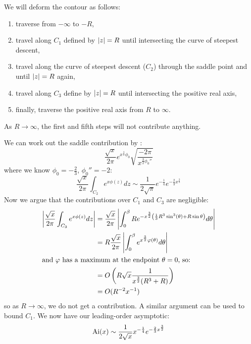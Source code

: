 \documentclass[../Main.tex]{subfiles}
\begin{document}
We will deform the contour as follows:
\begin{enumerate}
    \item traverse from $-\infty$ to $-R$,
    \item travel along $C_1$ defined by $\left|z\right| = R$ until intersecting the curve of steepest descent,
    \item travel along the curve of steepest descent ($C_2$) through the saddle point and until $\left|z\right| = R$ again,
    \item travel along $C_3$ define by $\left|z\right| = R$ until intersecting the positive real axis,
    \item finally, traverse the positive real axis from $R$ to $\infty$.
\end{enumerate}
As $R \to \infty$, the first and fifth steps will not contribute anything.

We can work out the saddle contribution by :
\begin{equation*}
    \frac{\sqrt{x}}{2\pi} e^{x^{\frac32} \phi_0} \sqrt{\frac{-2\pi}{x^{\frac32 \phi_0''}}}
\end{equation*}
where we know $\phi_0 = -\frac23$, $\phi_0'' = -2$:
\begin{equation*}
    \frac{\sqrt{x}}{2\pi} \int_{C_2} e^{x\phi(z)} dz \sim \frac{1}{2\sqrt{\pi}} e^{-\frac14} e^{-\frac23 x^{\frac32}}
\end{equation*}
Now we argue that the contributions over $C_1$ and $C_3$ are negligible:
\begin{align*}
    \left|\frac{\sqrt{x}}{2\pi}\int_{C_3}e^{x\phi(z)} dz\right| &= \frac{\sqrt{x}}{2\pi} \left|\int_{0}^{\beta} R e^{-x^{\frac32} \left(\frac13 R^3 \sin^3(\theta) + R\sin\theta\right)} d\theta\right| \\
    &= R\frac{\sqrt{x}}{2\pi} \left|\int_{0}^{\beta} e^{x^{\frac32} \varphi(\theta)} d\theta\right| \\
    \intertext{and $\varphi$ has a maximum at the endpoint $\theta = 0$, so:}
    &= O\left(R \sqrt{x} \frac{1}{x^{\frac32} (R^3 + R)}\right) \\
    &= O(R^{-2} x^{-1})
\end{align*}
so as $R \to \infty$, we do not get a contribution. A similar argument can be used to bound $C_1$. We now have our leading-order asymptotic:
\begin{equation*}
    \operatorname{Ai}(x) \sim \frac{1}{2\sqrt{x}} x^{-\frac14} e^{-\frac23 x^{\frac32}}
\end{equation*}
\end{document}
